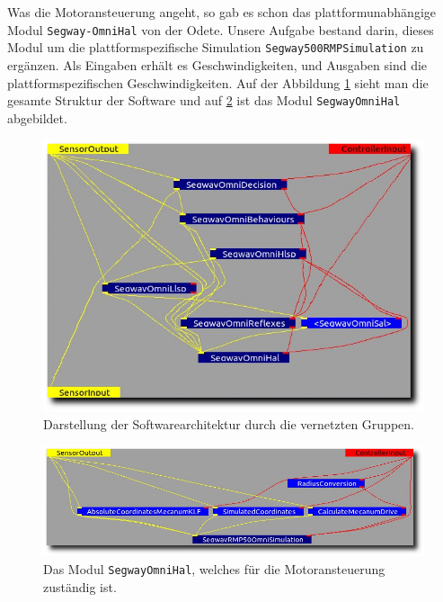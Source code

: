 Was die Motoransteuerung angeht, so gab es schon das plattformunabhängige Modul
\lstinline{Segway-}\lstinline{OmniHal} von der Odete.
Unsere Aufgabe bestand darin, dieses Modul um die plattformspezifische Simulation \lstinline{Segway500RMPSimulation} zu ergänzen.
Als Eingaben erhält es Geschwindigkeiten, und Ausgaben sind die plattformspezifischen Geschwindigkeiten.
Auf der Abbildung \ref{fig:mca2architecture} sieht man die gesamte Struktur der Software und auf \ref{fig:segwayHal} ist das Modul \lstinline{SegwayOmniHal} abgebildet.

\begin{figure}[h]
	\center
	\includegraphics[scale=0.5]{graphics/mca2architecture.png}
	\caption{\label{fig:mca2architecture} Darstellung der Softwarearchitektur durch die vernetzten Gruppen.}
\end{figure}

\begin{figure}[h]
	\center
	\includegraphics[scale=0.5]{graphics/segwayHal.png}
	\caption{\label{fig:segwayHal} Das Modul \lstinline{SegwayOmniHal}, welches für die Motoransteuerung zuständig ist.}
\end{figure}


